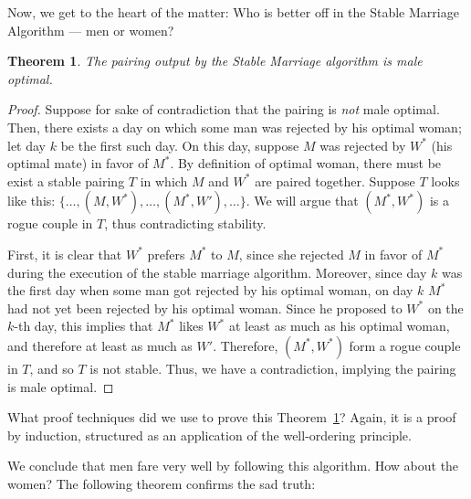\documentclass[11pt,fleqn]{article}
\newcounter{thm}
\newtheorem{theorem}{Theorem}[thm]
\begin{document}
Now, we get to the heart of the matter: Who is better off in the Stable Marriage Algorithm --- men or women?

\begin{theorem}\label{thm:maleopt}
    The pairing output by the Stable Marriage algorithm is male optimal.
\end{theorem}
\begin{proof}
Suppose for sake of contradiction that the pairing is {\it not\/} male optimal. Then, there exists a day on which some man was rejected by his optimal woman; let day $k$ be the first such day. On this day, suppose
$M$ was rejected by $W^*$ (his optimal mate) in favor of $M^*$. By definition
of optimal woman, there must be exist a stable pairing $T$ in which $M$ and $W^*$ are paired together.
Suppose $T$ looks like this: $\{\ldots,(M,W^*),\ldots,(M^*,W'),\ldots\}$.
We will argue that $(M^*,W^*)$ is a rogue couple in $T$, thus
contradicting stability.

First, it is clear that $W^*$ prefers $M^*$ to $M$, since she rejected $M$ in favor of $M^*$ during the execution of the stable marriage algorithm. Moreover, since day $k$ was the first day when some man got rejected by his optimal woman, on day $k$ $M^*$ had not yet been rejected by his optimal woman. Since he proposed to $W^*$ on the $k$-th day, this implies that $M^*$ likes
$W^*$ at least as much as his optimal woman, and therefore at least as much as $W'$. Therefore,
$(M^*,W^*)$ form a rogue couple in $T$, and so $T$ is not stable. Thus, we have a contradiction, implying the pairing is male optimal.
\end{proof}

What proof techniques did we use to prove this Theorem~\ref{thm:maleopt}? Again, it is a proof by induction,
structured as an application of the well-ordering principle.\\



We conclude that men fare very well by following this algorithm. How about the women? The following theorem confirms the sad truth:
\end{document}
